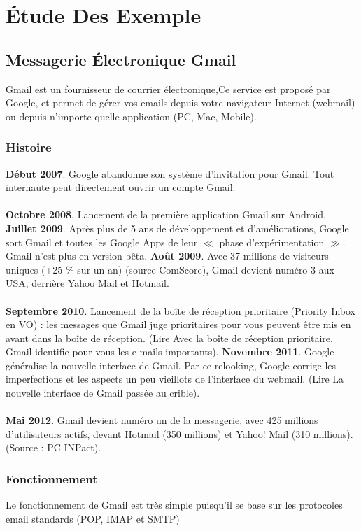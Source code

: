 \documentclass[french]{report}
\begin{document}
\section{\LARGE Étude Des Exemple }
\subsection{\LARGE Messagerie Électronique Gmail}
\LARGE Gmail est un fournisseur de courrier électronique,Ce service est proposé par Google, et permet de gérer vos emails depuis votre navigateur Internet (webmail) ou depuis n’importe quelle application (PC, Mac, Mobile).
\subsubsection{\LARGE Histoire}
\LARGE
\textbf{Début 2007}. Google abandonne son système d’invitation pour Gmail. Tout internaute peut directement ouvrir un compte Gmail.\\ \\
\textbf{Octobre 2008}. Lancement de la première application Gmail sur Android.
\textbf{Juillet 2009}. Après plus de 5 ans de développement et d’améliorations, Google sort Gmail et toutes les Google Apps de leur $\ll$ phase d’expérimentation $\gg$. Gmail n’est plus en version bêta.
\textbf{Août 2009}. Avec 37 millions de visiteurs uniques (+25 \% sur un an) (source ComScore), Gmail devient numéro 3 aux USA, derrière Yahoo Mail et Hotmail.\\ \\
\textbf{Septembre 2010}. Lancement de la boîte de réception prioritaire (Priority Inbox en VO) : les messages que Gmail juge prioritaires pour vous peuvent être mis en avant dans la boîte de réception. (Lire Avec la boîte de réception prioritaire, Gmail identifie pour vous les e-mails importants).
\textbf{Novembre 2011}. Google généralise la nouvelle interface de Gmail. Par ce relooking, Google corrige les imperfections et les aspects un peu vieillots de l’interface du webmail. (Lire La nouvelle interface de Gmail passée au crible).\\ \\
\textbf{Mai 2012}. Gmail devient numéro un de la messagerie, avec 425 millions d’utilisateurs actifs, devant Hotmail (350 millions) et Yahoo! Mail (310 millions). (Source : PC INPact).
\subsubsection{\LARGE Fonctionnement}
\LARGE Le fonctionnement de Gmail est très simple puisqu’il se base sur les protocoles email standards (POP, IMAP et SMTP)
\newpage
\end{document}

